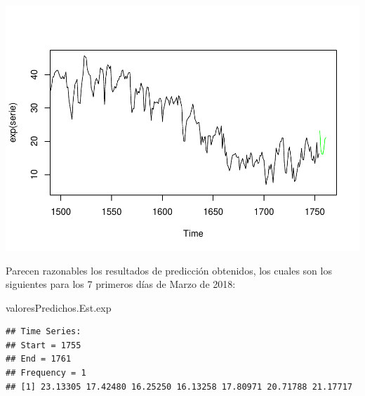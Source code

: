 \documentclass[]{article}
\newenvironment{Shaded}{\begin{snugshade}}{\end{snugshade}}
\newcommand{\NormalTok}[1]{#1}
\begin{document}
\includegraphics{timeSeries_files/figure-latex/unnamed-chunk-66-1.pdf}

Parecen razonables los resultados de predicción obtenidos, los cuales
son los siguientes para los 7 primeros días de Marzo de 2018:

\begin{Shaded}
\begin{Highlighting}[]
\NormalTok{valoresPredichos.Est.exp}
\end{Highlighting}
\end{Shaded}

\begin{verbatim}
## Time Series:
## Start = 1755 
## End = 1761 
## Frequency = 1 
## [1] 23.13305 17.42480 16.25250 16.13258 17.80971 20.71788 21.17717
\end{verbatim}
\end{document}
